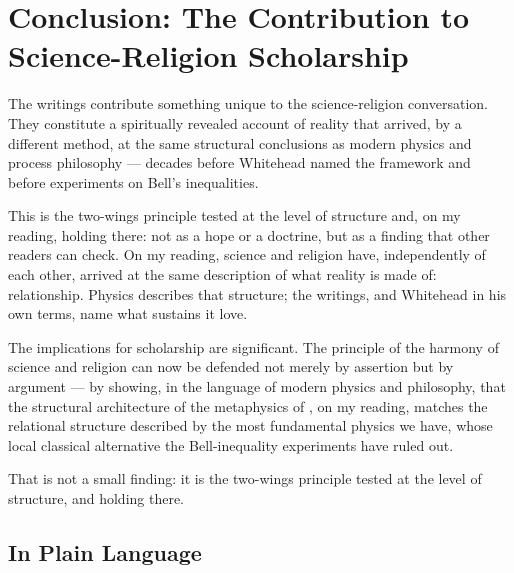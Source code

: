 
\section{Conclusion: The \bahai Contribution to Science-Religion Scholarship}
\label{sec:conclusion}


The \bahai writings contribute something unique to the science-religion
conversation.
They constitute a spiritually revealed account of reality that arrived,
by a different method, at the same structural conclusions as modern physics
and process philosophy --- decades before Whitehead named the framework and
before experiments on Bell's inequalities.

This is the two-wings principle tested at the level of structure and, on my
reading, holding there: not as a hope or a doctrine, but as a finding that
other readers can check.
On my reading, science and religion have, independently of each other, arrived at the same
description of what reality is made of: relationship.
Physics describes that structure; the \bahai writings, and Whitehead in his
own terms, name what sustains it love.

The implications for \bahai scholarship are significant.
The principle of the harmony of science and religion can now be defended not
merely by assertion but by argument --- by showing, in the language of modern
physics and philosophy, that the structural architecture of the \bahai
metaphysics of \mahabbat, on my reading, matches the relational structure
described by the most fundamental physics we have, whose local classical
alternative the Bell-inequality experiments have ruled out.

That is not a small finding: it is the two-wings principle tested at the
level of structure, and holding there.

\subsection*{In Plain Language}

